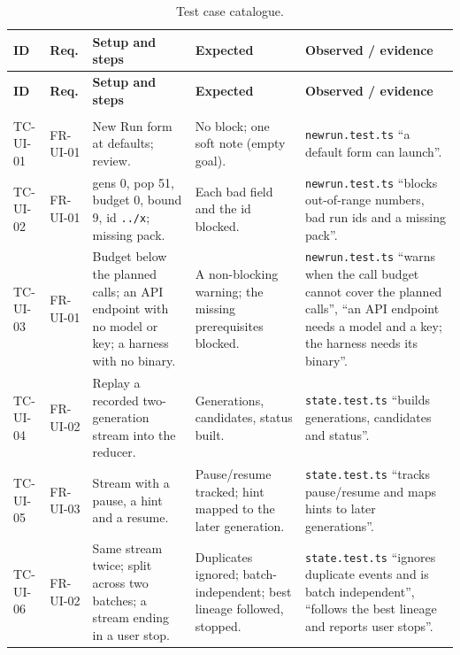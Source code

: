 \begin{scriptsize}
\setlength{\tabcolsep}{3.5pt}
\begin{longtable}{@{}>{\raggedright\arraybackslash}p{}>{\raggedright\arraybackslash}p{}>{\raggedright\arraybackslash}p{}>{\raggedright\arraybackslash}p{}>{\raggedright\arraybackslash}p{}@{}}
\caption{Test case catalogue.}\label{tab:test-cases}\\
\toprule
\textbf{ID} & \textbf{Req.} & \textbf{Setup and steps} & \textbf{Expected} & \textbf{Observed / evidence} \\
\midrule
\endfirsthead
\toprule
\textbf{ID} & \textbf{Req.} & \textbf{Setup and steps} & \textbf{Expected} & \textbf{Observed / evidence} \\
\midrule
\endhead
\multicolumn{5}{@{}l}{\emph{User interface (Vitest reducer, form and status logic; headless-Chrome scenario)}}\\
TC-UI-01 & FR-UI-01 & New Run form at defaults; review. & No block; one soft note (empty goal). & \texttt{newrun.test.ts} ``a default form can launch''. \\
TC-UI-02 & FR-UI-01 & gens 0, pop 51, budget 0, bound 9, id \texttt{../x}; missing pack. & Each bad field and the id blocked. & \texttt{newrun.test.ts} ``blocks out-of-range numbers, bad run ids and a missing pack''. \\
TC-UI-03 & FR-UI-01 & Budget below the planned calls; an API endpoint with no model or key; a harness with no binary. & A non-blocking warning; the missing prerequisites blocked. & \texttt{newrun.test.ts} ``warns when the call budget cannot cover the planned calls'', ``an API endpoint needs a model and a key; the harness needs its binary''. \\
TC-UI-04 & FR-UI-02 & Replay a recorded two-generation stream into the reducer. & Generations, candidates, status built. & \texttt{state.test.ts} ``builds generations, candidates and status''. \\
TC-UI-05 & FR-UI-03 & Stream with a pause, a hint and a resume. & Pause/resume tracked; hint mapped to the later generation. & \texttt{state.test.ts} ``tracks pause/resume and maps hints to later generations''. \\
TC-UI-06 & FR-UI-02 & Same stream twice; split across two batches; a stream ending in a user stop. & Duplicates ignored; batch-independent; best lineage followed, stopped. & \texttt{state.test.ts} ``ignores duplicate events and is batch independent'', ``follows the best lineage and reports user stops''. \\

\end{longtable}
\end{scriptsize}
